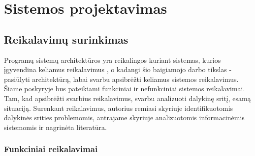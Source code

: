 

\section{Sistemos projektavimas}





\subsection{Reikalavimų surinkimas}
Programų sistemų architektūros yra reikalingos kuriant sistemas, kurios įgyvendina keliamus reikalavimus \cite{Bass2013}, o kadangi šio baigiamojo darbo tikslas - pasiūlyti architektūrą, labai svarbu apsibrėžti keliamus sistemos reikalavimus. Šiame poskyryje bus pateikiami funkciniai ir nefunkciniai sistemos reikalavimai. Tam, kad apsibrėžti svarbius reikalavimus, svarbu analizuoti dalykinę sritį, esamą situaciją. Surenkant reikalavimus, autorius remiasi skyriuje identifikuotomis dalykinės srities problemomis, antrajame skyriuje analizuotomis informacinėmis sistemomis ir nagrinėta literatūra.
\subsubsection{Funkciniai reikalavimai}

